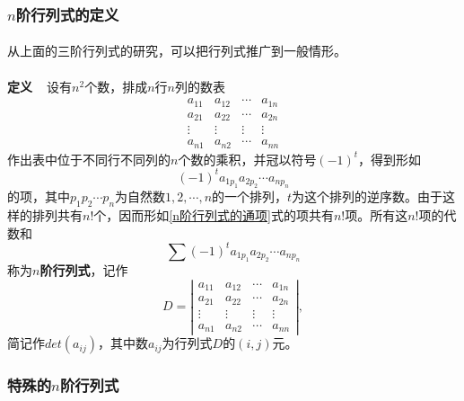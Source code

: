 \subsubsection{$n$阶行列式的定义}
\paragraph{}
从上面的三阶行列式的研究，可以把行列式推广到一般情形。

\paragraph{}
\textbf{定义~~}设有$n^2$个数，排成$n$行$n$列的数表
\begin{equation*}
\begin{array}{cccc}
  a_{11} & a_{12} & \cdots & a_{1n} \\
  a_{21} & a_{22} & \cdots & a_{2n} \\
  \vdots & \vdots & \vdots & \vdots \\
  a_{n1} & a_{n2} & \cdots & a_{nn}
\end{array}
\end{equation*}
作出表中位于不同行不同列的$n$个数的乘积，并冠以符号$(-1)^t$，得到形如
\begin{equation}
  \label{n阶行列式的通项}
  (-1)^ta_{1p_1}a_{2p_2}\cdots a_{np_n}
\end{equation}
的项，其中$p_1p_2\cdots p_n$为自然数$1,2,\cdots,n$的一个排列，$t$为这个排列的逆序数。由于这样的排列共有$n!$个，因而形如\eqref{n阶行列式的通项}式的项共有$n!$项。所有这$n!$项的代数和
\begin{equation*}
  \sum(-1)^ta_{1p_1}a_{2p_2}\cdots a_{np_n}
\end{equation*}
称为\textbf{$n$阶行列式}，记作
\begin{equation*}
  D = \left|\begin{array}{cccc}
    a_{11} & a_{12} & \cdots & a_{1n} \\
    a_{21} & a_{22} & \cdots & a_{2n} \\
    \vdots & \vdots & \vdots & \vdots \\
    a_{n1} & a_{n2} & \cdots & a_{nn}
  \end{array}\right|,
\end{equation*}
简记作$det(a_{ij})$，其中数$a_{ij}$为行列式$D$的$(i,j)$元。

\subsubsection{特殊的$n$阶行列式}
